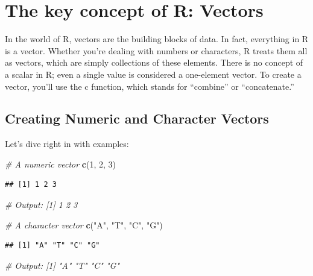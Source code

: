 \documentclass[
]{book}
\newenvironment{Shaded}{\begin{snugshade}}{\end{snugshade}}
\newcommand{\CommentTok}[1]{\textcolor[rgb]{0.56,0.35,0.01}{\textit{#1}}}
\newcommand{\DecValTok}[1]{\textcolor[rgb]{0.00,0.00,0.81}{#1}}
\newcommand{\FunctionTok}[1]{\textcolor[rgb]{0.13,0.29,0.53}{\textbf{#1}}}
\newcommand{\NormalTok}[1]{#1}
\newcommand{\StringTok}[1]{\textcolor[rgb]{0.31,0.60,0.02}{#1}}
\begin{document}
\hypertarget{the-key-concept-of-r-vectors}{%
\section{The key concept of R: Vectors}\label{the-key-concept-of-r-vectors}}

In the world of R, vectors are the building blocks of data. In fact, everything in R is a vector. Whether you're dealing with numbers or characters, R treats them all as vectors, which are simply collections of these elements. There is no concept of a scalar in R; even a single value is considered a one-element vector. To create a vector, you'll use the c function, which stands for ``combine'' or ``concatenate.''

\hypertarget{creating-numeric-and-character-vectors}{%
\subsection{Creating Numeric and Character Vectors}\label{creating-numeric-and-character-vectors}}

Let's dive right in with examples:

\begin{Shaded}
\begin{Highlighting}[]
\CommentTok{\# A numeric vector}
\FunctionTok{c}\NormalTok{(}\DecValTok{1}\NormalTok{, }\DecValTok{2}\NormalTok{, }\DecValTok{3}\NormalTok{)}
\end{Highlighting}
\end{Shaded}

\begin{verbatim}
## [1] 1 2 3
\end{verbatim}

\begin{Shaded}
\begin{Highlighting}[]
\CommentTok{\# Output: [1] 1 2 3}

\CommentTok{\# A character vector}
\FunctionTok{c}\NormalTok{(}\StringTok{"A"}\NormalTok{, }\StringTok{"T"}\NormalTok{, }\StringTok{"C"}\NormalTok{, }\StringTok{"G"}\NormalTok{)}
\end{Highlighting}
\end{Shaded}

\begin{verbatim}
## [1] "A" "T" "C" "G"
\end{verbatim}

\begin{Shaded}
\begin{Highlighting}[]
\CommentTok{\# Output: [1] "A" "T" "C" "G"}
\end{Highlighting}
\end{Shaded}
\end{document}
